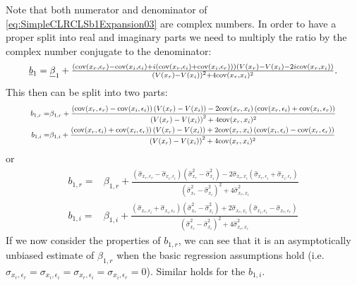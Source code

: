\documentclass[
]{book}
\begin{document}
Note that both numerator and denominator of \eqref{eq:SimpleCLRCLSb1Expansion03} are complex numbers. In order to have a proper split into real and imaginary parts we need to multiply the ratio by the complex number conjugate to the denominator:
\begin{equation}
\resizebox{0.9\textwidth}{!}{$
        \underline{b}_1 = \underline{\beta}_1 + \frac{\left(\mathrm{cov}(x_r, \epsilon_r) - \mathrm{cov}(x_i, \epsilon_i) + i (\mathrm{cov}(x_r, \epsilon_i) + \mathrm{cov}(x_i, \epsilon_r))\right)\left(V(x_r) - V(x_i) - 2i \mathrm{cov}(x_r, x_i)\right)}{\left(V(x_r) - V(x_i)\right)^2 + 4 \mathrm{cov}(x_r, x_i)^2} $}.
    \label{eq:SimpleCLRCLSb1Expansion04}
\end{equation}
This then can be split into two parts:
\begin{equation}
\resizebox{0.9\textwidth}{!}{$
    \begin{aligned}
        b_{1,r} = & \beta_{1,r} + \frac{\left(\mathrm{cov}(x_r, \epsilon_r) - \mathrm{cov}(x_i, \epsilon_i)\right) \left(V(x_r) - V(x_i)\right) - 2 \mathrm{cov}(x_r, x_i) \left(\mathrm{cov}(x_r, \epsilon_i) + \mathrm{cov}(x_i, \epsilon_r)\right)}{\left(V(x_r) - V(x_i)\right)^2 + 4 \mathrm{cov}(x_r, x_i)^2} \\
        b_{1,i} = & \beta_{1,i} + \frac{\left( \mathrm{cov}(x_r, \epsilon_i) + \mathrm{cov}(x_i, \epsilon_r)\right)\left(V(x_r) - V(x_i) \right) + 2 \mathrm{cov}(x_r, x_i) \left(\mathrm{cov}(x_i, \epsilon_i) - \mathrm{cov}(x_r, \epsilon_r)\right)}{\left(V(x_r) - V(x_i)\right)^2 + 4 \mathrm{cov}(x_r, x_i)^2} 
    \end{aligned}$}
    \label{eq:SimpleCLRCLSb1Expansion05}
\end{equation}
or
\begin{equation}
    \begin{aligned}
        b_{1,r} = & \beta_{1,r} + \frac{\left(\hat{\sigma}_{x_r, \epsilon_r} - \hat{\sigma}_{x_i, \epsilon_i}\right) \left(\hat{\sigma}_{x_r}^2 - \hat{\sigma}_{x_i}^2 \right) - 2 \hat{\sigma}_{x_r, x_i} \left(\hat{\sigma}_{x_r, \epsilon_i} + \hat{\sigma}_{x_i, \epsilon_r}\right)}{\left(\hat{\sigma}_{x_r}^2 - \hat{\sigma}_{x_i}^2\right)^2 + 4 \hat{\sigma}_{x_r, x_i}^2} \\
        b_{1,i} = & \beta_{1,i} + \frac{\left( \hat{\sigma}_{x_r, \epsilon_i} + \hat{\sigma}_{x_i, \epsilon_r}\right)\left(\hat{\sigma}_{x_r}^2 - \hat{\sigma}_{x_i}^2 \right) + 2 \hat{\sigma}_{x_r, x_i} \left(\hat{\sigma}_{x_i, \epsilon_i} - \hat{\sigma}_{x_r, \epsilon_r}\right)}{\left(\hat{\sigma}_{x_r}^2 - \hat{\sigma}_{x_i}^2\right)^2 + 4 \hat{\sigma}_{x_r, x_i}^2}
    \end{aligned}
    \label{eq:SimpleCLRCLSb1Expansion06}
\end{equation}
If we now consider the properties of \(b_{1,r}\), we can see that it is an asymptotically unbiased estimate of \(\beta_{1,r}\) when the basic regression assumptions hold (i.e.~\({\sigma}_{x_r, \epsilon_r} = {\sigma}_{x_i, \epsilon_i} = {\sigma}_{x_r, \epsilon_i} = {\sigma}_{x_i, \epsilon_r}=0\)). Similar holds for the \(b_{1,i}\).
\end{document}
